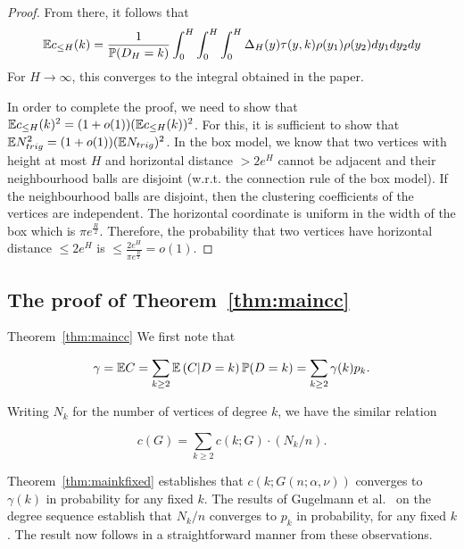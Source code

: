 \begin{proof}
From there, it follows that
\begin{align*}
\mathbb{E} c_{\leq H}(k) = \frac{1}{\mathbb{P}(D_H=k)} \int_0^H \int_0^H \int_0^H \Delta_{H}(y) \tau(y,k) \rho(y_1)\rho(y_2)dy_1dy_2 dy
\end{align*}
For $H\rightarrow \infty$, this converges to the integral obtained in the paper.

In order to complete the proof, we need to show that $\mathbb{E} c_{\leq H}(k)^2 = (1+o(1))(\mathbb{E} c_{\leq H}(k))^2$. For this, it is sufficient to show that $\mathbb{E} N_{trig}^2 = (1+o(1))(\mathbb{E} N_{trig})^2$. In the box model, we know that two vertices with height at most $H$ and horizontal distance $>2e^H$ cannot be adjacent and their neighbourhood balls are disjoint (w.r.t. the connection rule of the box model). If the neighbourhood balls are disjoint, then the clustering coefficients of the vertices are independent. The horizontal coordinate is uniform in the width of the box which is $\pi e^{\frac{R}{2}}$. Therefore, the probability that two vertices have horizontal distance $\leq 2e^H$ is $\leq \frac{2e^H}{\pi e^{\frac{R}{2}}} = o(1)$.
\end{proof}


\subsection{The proof of Theorem~\ref{thm:maincc}}



\begin{proofof}{Theorem~\ref{thm:maincc}}
We first note that

$$ \gamma = {\mathbb E} C = \sum_{k\geq 2} {\mathbb E}\left( C | D=k \right) \mathbb{P}( D=k ) = \sum_{k\geq 2} \gamma(k) p_k. $$

Writing $N_k$ for the number of vertices of degree $k$, we have the similar relation

$$ c(G) = \sum_{k\geq 2} c(k;G) \cdot (N_k/n). $$

Theorem~\ref{thm:mainkfixed} establishes that $c(k;G(n;\alpha,\nu))$ converges to $\gamma(k)$ in probability 
for any fixed $k$. The results of Gugelmann et al.~\cite{gugelmann2012random} on the degree sequence establish 
that $N_k/n$ converges to $p_k$ in probability, for any fixed $k$.
The result now follows in a straightforward manner from these observations.
\end{proofof}
